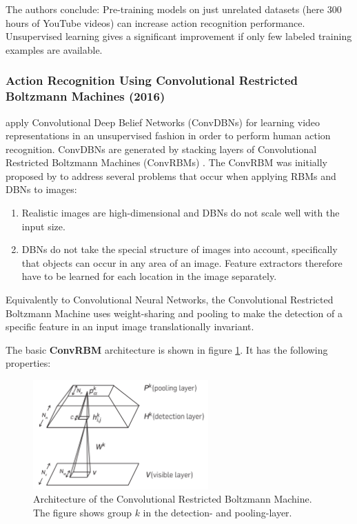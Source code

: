The authors conclude: Pre-training models on just unrelated datasets (here 300 hours of YouTube videos) can increase action recognition performance.
Unsupervised learning gives a significant improvement if only few labeled training examples are available.


\subsubsection{Action Recognition Using Convolutional Restricted Boltzmann Machines (2016)}
\textcite{palasek_action_2016} apply Convolutional Deep Belief Networks (ConvDBNs) for learning video representations in an unsupervised fashion in order to perform human action recognition.
ConvDBNs are generated by stacking layers of Convolutional Restricted Boltzmann Machines (ConvRBMs) \cite{lee_convolutional_2009-1}.
The ConvRBM was initially proposed by \textcite{lee_convolutional_2009-1} to address several problems that occur when applying RBMs and DBNs to images:

\begin{enumerate}
    \item Realistic images are high-dimensional and DBNs do not scale well with the input size. \cite{lee_convolutional_2009-1} 
    \item DBNs do not take the special structure of images into account, specifically that objects can occur in any area of an image. Feature extractors therefore have to be learned for each location in the image separately. \cite{lee_convolutional_2009-1} 
\end{enumerate}

Equivalently to Convolutional Neural Networks, the Convolutional Restricted Boltzmann Machine uses weight-sharing and pooling to make the detection of a specific feature in an input image translationally invariant.

The basic \textbf{ConvRBM} architecture is shown in figure \ref{fig:convrbm_architecture}.
It has the following properties:\cite{lee_convolutional_2009-1}

\begin{figure}[H]
    \centering
    \includegraphics[width=0.6\textwidth]{img_deep/convrbm_architecture}
    \caption{Architecture of the Convolutional Restricted Boltzmann Machine. The figure shows group $k$ in the detection- and pooling-layer. \cite{lee_convolutional_2009-1}}
    \label{fig:convrbm_architecture}
\end{figure}

